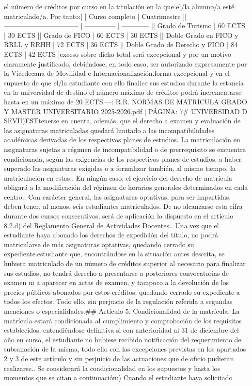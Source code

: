 \documentclass{article}
\begin{document}
\begin{itemize}
el número de créditos por curso en la titulación en la que el/la alumno/a esté matriculado/a. Por tanto:\n\n|                                   | Curso completo | Cuatrimestre |\n| --------------------------------- | -------------- | ------------ |\n| Grado de Turismo                  | 60 ECTS        | 30 ECTS      |\n| Grado de FICO                     | 60 ECTS        | 30 ECTS      |\n| Doble Grado en FICO y RRLL y RRHH | 72 ECTS        | 36 ECTS      |\n| Doble Grado de Derecho y FICO     | 84 ECTS        | 42 ECTS      |\n\nCualquier exceso sobre dicho total será excepcional y por un motivo claramente justificado, debiéndose, en todo caso, ser autorizado expresamente por la Vicedecana de Movilidad e Internacionalización.\n\nDe forma excepcional y en el supuesto de que el/la estudiante con ello finalice sus estudios durante la estancia en la universidad de destino el número máximo de créditos podrá incrementarse hasta en un máximo de 20 ECTS.\n\n---\n\nFUENTE: R.R. NORMAS DE MATRICULA GRADO Y MASTER UNIVERSITARIO 2025-2026.pdf | PÁGINA: 7\n# UNIVERSIDAD D SEVII\n\nC)EST\n{} tenerse en cuenta, además, que el derecho a examen y evaluación de las asignaturas matriculadas quedará limitado a las incompatibilidades académicas derivadas de los respectivos planes de estudios. La matriculación en asignaturas sujetas a régimen de incompatibilidad o de prerrequisito se encuentra condicionada, según las exigencias de los respectivos planes de estudios, a haber superado las asignaturas exigidas o a formalizar también, al mismo tiempo, la matriculación en estas.\n{}. En ningún caso, el ejercicio del derecho de matrícula obligará a la modificación del régimen de horarios generales determinados en cada centro.\n{}. Con carácter general, las asignaturas optativas, para ser impartidas, deben tener, al menos, seis estudiantes matriculados. De no alcanzarse esta cifra durante dos cursos consecutivos, será de aplicación lo dispuesto en el artículo 8.2.d) del Reglamento General de Actividades Docentes.\n{}. Una vez que el estudiante haya abonado los derechos de expedición del título, no podrá matricularse de más asignaturas optativas, quedando cerrado su expediente.\n\nEl estudiante que, encontrándose en la situación antes descrita, se hubiera matriculado de un número de créditos superior al necesario para finalizar sus estudios, no tendrá derecho a presentarse a posteriores convocatorias de examen ni a aparecer en actas de examen, y tampoco a la devolución de los precios públicos abonados por estos créditos, quedando cerrado su expediente a todos los efectos. Todo ello, sin perjuicio de la regulación referida a segundas menciones o especialidades.\n\n## Artículo 5. Condicionalidad de la matrícula\n{}. La matrícula estará condicionada al cumplimiento y comprobación de los requisitos establecidos, entendiéndose definitiva si con anterioridad al 31 de diciembre del año en curso, el estudiante no hubiese recibido notificación del requerimiento de subsanación de la misma, todo ello con las excepciones previstas en los apartados 2 y 3 de este artículo y sin perjuicio de las actuaciones que de oficio pudieran realizarse.\n{}. Se considerará la condicionalidad en los supuestos y hasta los momentos que se citan a continuación:\n\na) Cuando el estudiante haya solicitado 
\end{itemize}
\end{document}
